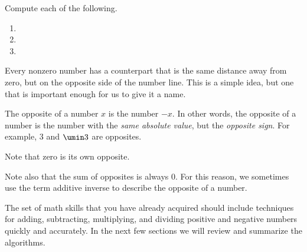 \begin{boxedex}
Compute each of the following.

\begin{enumerate}[itemsep=10pt]
\item {}

\item {}

\item {}
\end{enumerate}
\end{boxedex}

Every nonzero number has a counterpart that is the same distance away from zero, but on the opposite side of the number line. This is a simple idea, but one that is important enough for us to give it a name.

\begin{boxeddef}[Opposite]
The \gls{opposite} of a number $x$ is the number $-x$. In other words, the opposite of a number is the number with the {\em same absolute value}, but the {\em opposite sign}. For example, 3 and $\umin3$ are opposites.

\bigskip
\begin{center}
\end{center}

Note that zero is its own opposite.

Note also that the sum of opposites is always 0. For this reason, we sometimes use the term \gls{additive inverse} to describe the opposite of a number.
\end{boxeddef}

The set of math skills that you have already acquired should include techniques for adding, subtracting, multiplying, and dividing positive and negative numbers quickly and accurately. In the next few sections we will review and summarize the algorithms.

